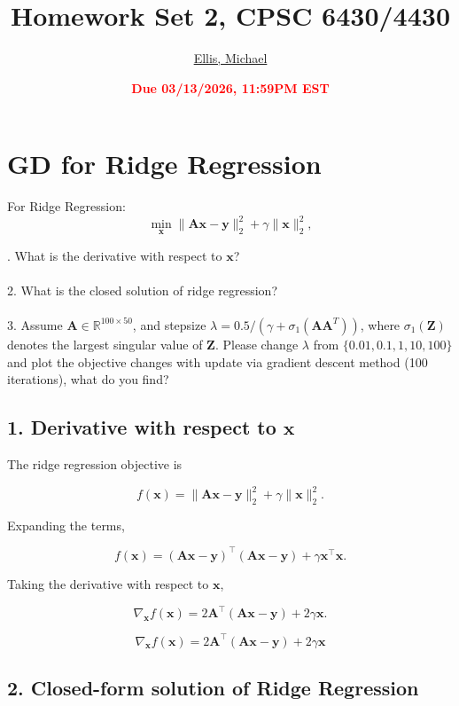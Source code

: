 \documentclass[11pt]{article}
\title{{\bf Homework Set 2, CPSC 6430/4430}}
\author{\Large\underline{Ellis, Michael}}
\date{\textbf{\Large\textcolor{red}{Due 03/13/2026, 11:59PM EST}}}
\begin{document}
\maketitle

\section*{GD for Ridge Regression}

For Ridge Regression: \\

$$
\min _{\mathbf{x}}\|\mathbf{A x}-\mathbf{y}\|_2^2+\gamma\|\mathbf{x}\|_2^2,
$$

. What is the derivative with respect to $\mathbf{x}$? \\\\
2. What is the closed solution of ridge regression? \\\\
3. Assume $\mathbf{A} \in \mathbb{R}^{100 \times 50}$, and stepsize $\lambda=0.5 /\left(\gamma+\sigma_1\left(\mathbf{A A}^T\right)\right)$, where $\sigma_1(\mathbf{Z})$ denotes the largest singular value of $\mathbf{Z}$. Please change $\lambda$ from $\{0.01,0.1,1,10,100\}$ and plot the objective changes with update via gradient descent method (100 iterations), what do you find?


\subsection*{1. Derivative with respect to $\mathbf{x}$}

The ridge regression objective is

\[
f(\mathbf{x}) = \|\mathbf{A}\mathbf{x}-\mathbf{y}\|_2^2 + \gamma \|\mathbf{x}\|_2^2 .
\]

Expanding the terms,

\[
f(\mathbf{x}) =
(\mathbf{A}\mathbf{x}-\mathbf{y})^\top(\mathbf{A}\mathbf{x}-\mathbf{y})
+ \gamma \mathbf{x}^\top \mathbf{x}.
\]

Taking the derivative with respect to $\mathbf{x}$,

\[
\nabla_{\mathbf{x}} f(\mathbf{x})
=
2\mathbf{A}^\top(\mathbf{A}\mathbf{x}-\mathbf{y})
+
2\gamma \mathbf{x}.
\]

\[
\boxed{
\nabla_{\mathbf{x}} f(\mathbf{x})
=
2\mathbf{A}^\top(\mathbf{A}\mathbf{x}-\mathbf{y})
+
2\gamma \mathbf{x}
}
\]

\subsection*{2. Closed-form solution of Ridge Regression}
\end{document}
